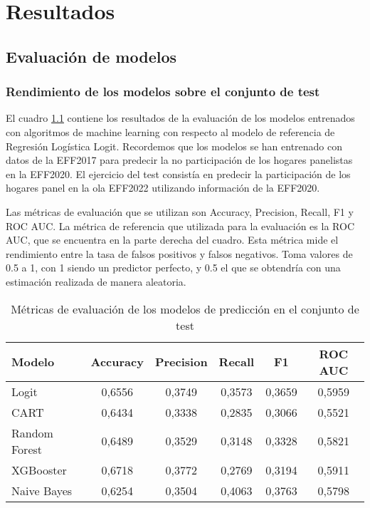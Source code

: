 \chapter{Resultados}
\label{chapter:resultados}

\section{Evaluación de modelos}
\label{section:evaluation_models}

\subsection*{Rendimiento de los modelos sobre el conjunto de test}

El cuadro \ref{table:test} contiene los resultados de la evaluación de los modelos entrenados con algoritmos de machine learning con respecto al modelo de referencia de Regresión Logística Logit. Recordemos que los modelos se han entrenado con datos de la EFF2017 para predecir la no participación de los hogares panelistas en la EFF2020. El ejercicio del test consistía en predecir la participación de los hogares panel en la ola EFF2022 utilizando información de la EFF2020.

Las métricas de evaluación que se utilizan son Accuracy, Precision, Recall, F1 y ROC AUC. La métrica de referencia que utilizada para la evaluación es la ROC AUC, que se encuentra en la parte derecha del cuadro. Esta métrica mide el rendimiento entre la tasa de falsos positivos y falsos negativos. Toma valores de 0.5 a 1, con 1 siendo un predictor perfecto, y 0.5 el que se obtendría con una estimación realizada de manera aleatoria.

\begin{table}[ht]
    \centering
    \begin{tabular}{lccccc}
    \hline
        \textbf{Modelo} & \textbf{Accuracy} & \textbf{Precision} & \textbf{Recall} & \textbf{F1} & \textbf{ROC AUC} \\ \hline
        Logit & 0,6556 & 0,3749 & 0,3573 & 0,3659 & 0,5959 \\ 
        CART & 0,6434 & 0,3338 & 0,2835 & 0,3066 & 0,5521 \\ 
        Random Forest & 0,6489 & 0,3529 & 0,3148 & 0,3328 & 0,5821 \\ 
        XGBooster & 0,6718 & 0,3772 & 0,2769 & 0,3194 & 0,5911 \\ 
        Naive Bayes & 0,6254 & 0,3504 & 0,4063 & 0,3763 & 0,5798 \\ \hline
    \end{tabular}
    \caption{Métricas de evaluación de los modelos de predicción en el conjunto de test}
    \label{table:test}
\end{table}

